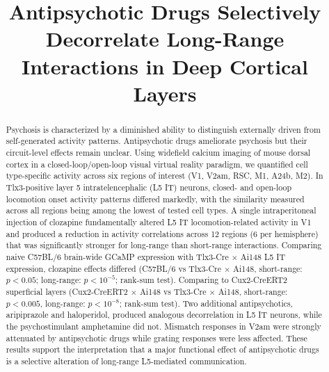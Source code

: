 \documentclass[11pt]{article}
\title{Antipsychotic Drugs Selectively Decorrelate Long-Range Interactions in Deep Cortical Layers}
\author{}
\date{}
\begin{document}
\maketitle

\begin{abstract}
Psychosis is characterized by a diminished ability to distinguish externally driven from self-generated activity patterns. Antipsychotic drugs ameliorate psychosis but their circuit-level effects remain unclear. Using widefield calcium imaging of mouse dorsal cortex in a closed-loop/open-loop visual virtual reality paradigm, we quantified cell type-specific activity across six regions of interest (V1, V2am, RSC, M1, A24b, M2). In Tlx3-positive layer 5 intratelencephalic (L5 IT) neurons, closed- and open-loop locomotion onset activity patterns differed markedly, with the similarity measured across all regions being among the lowest of tested cell types. A single intraperitoneal injection of clozapine fundamentally altered L5 IT locomotion-related activity in V1 and produced a reduction in activity correlations across 12 regions (6 per hemisphere) that was significantly stronger for long-range than short-range interactions. Comparing naive C57BL/6 brain-wide GCaMP expression with Tlx3-Cre $\times$ Ai148 L5 IT expression, clozapine effects differed (C57BL/6 vs Tlx3-Cre $\times$ Ai148, short-range: $p < 0.05$; long-range: $p < 10^{-5}$; rank-sum test). Comparing to Cux2-CreERT2 superficial layers (Cux2-CreERT2 $\times$ Ai148 vs Tlx3-Cre $\times$ Ai148, short-range: $p < 0.005$, long-range: $p < 10^{-8}$; rank-sum test). Two additional antipsychotics, aripiprazole and haloperidol, produced analogous decorrelation in L5 IT neurons, while the psychostimulant amphetamine did not. Mismatch responses in V2am were strongly attenuated by antipsychotic drugs while grating responses were less affected. These results support the interpretation that a major functional effect of antipsychotic drugs is a selective alteration of long-range L5-mediated communication.
\end{abstract}
\end{document}
